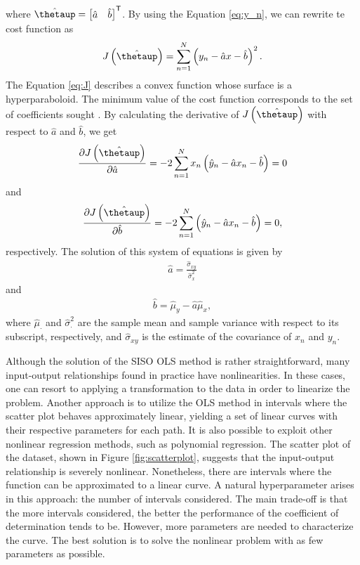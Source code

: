 \documentclass[english]{sobraep}
\newcommand{\trans}{\mathsf{T}}
\begin{document}
where \(\hat{\boldsymbol{\thetaup}} = \begin{bmatrix} \hat{a} & \hat{b} \end{bmatrix}^\trans\). By using the Equation \eqref{eq:y_n}, we can rewrite te cost function as
\begin{align}
    \label{eq:J}
    J\left( \hat{\boldsymbol{\thetaup}} \right) = \sum_{n=1}^{N} \left( y_n - \hat{a}x - \hat{b} \right)^2.
\end{align}
The Equation \eqref{eq:J} describes a convex function whose surface is a hyperparaboloid. The minimum value of the cost function corresponds to the set of coefficients sought \cite{diniz1997adaptive}. By calculating the derivative of \(J\left( \hat{\boldsymbol{\thetaup}} \right)\) with respect to \(\hat{a}\) and \(\hat{b}\), we get
\begin{align}
    \frac{\partial J\left( \hat{\boldsymbol{\thetaup}} \right)}{\partial \hat{a}} = -2 \sum_{n=1}^{N} x_n\left( \hat{y}_n - \hat{a}x_n - \hat{b} \right) = 0
\end{align}
and
\begin{align}
    \frac{\partial J\left( \hat{\boldsymbol{\thetaup}} \right)}{\partial \hat{b}} = -2 \sum_{n=1}^{N} \left( \hat{y}_n - \hat{a}x_n - \hat{b} \right) = 0,
\end{align}
respectively. The solution of this system of equations is given by
\begin{align}
    \hat{a} = \frac{\hat{\sigma}_{xy}}{\hat{\sigma}^2_x}
\end{align}
and
\begin{align}
\hat{b} = \hat{\mu}_y - \hat{a}\hat{\mu}_x,
\end{align}
where \(\hat{\mu}_{\cdot}\) and \(\hat{\sigma}_{\cdot}^2\) are the sample mean and sample variance with respect to its subscript, respectively, and \(\hat{\sigma}_{xy}\) is the estimate of the covariance of \(x_n\) and \(y_n\).

Although the solution of the SISO OLS method is rather straightforward, many input-output relationships found in practice have nonlinearities. In these cases, one can resort to applying a transformation to the data in order to linearize the problem. Another approach is to utilize the OLS method in intervals where the scatter plot behaves approximately linear, yielding a set of linear curves with their respective parameters for each path. It is also possible to exploit other nonlinear regression methods, such as polynomial regression. The scatter plot of the dataset, shown in Figure \ref{fig:scatterplot}, suggests that the input-output relationship is severely nonlinear. Nonetheless, there are intervals where the function can be approximated to a linear curve. A natural hyperparameter arises in this approach: the number of intervals considered. The main trade-off is that the more intervals considered, the better the performance of the coefficient of determination tends to be. However, more parameters are needed to characterize the curve. The best solution is to solve the nonlinear problem with as few parameters as possible.
\end{document}
